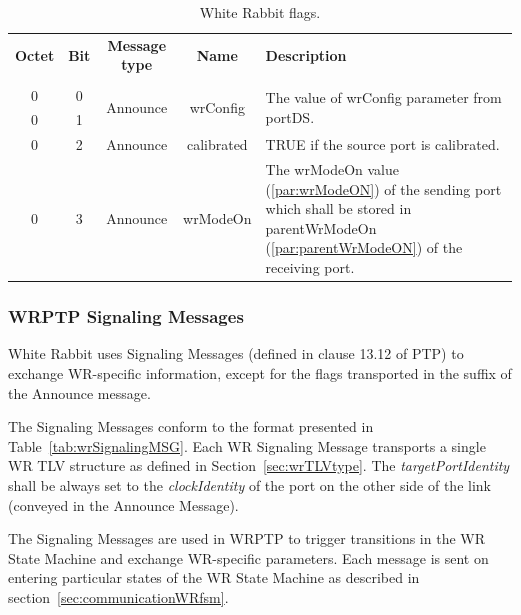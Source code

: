 \documentclass[a4paper, 12pt]{article}
\begin{document}
\begin{table}[ht!]
\caption{White Rabbit flags.}
\centering
\begin{tabular}{| c | c | c | c | p{5.3cm} |}          \hline

\textbf{Octet} &\textbf{Bit} & \textbf{Message type} & \textbf{Name}  & \textbf{Description}  \\ 
               &             &                       &                &              \\ \hline
0              &0   	& \multirow{2}{*}{Announce} 	& \multirow{2}{*}{wrConfig}  &
\multirow{2}{5.3cm}{The value of wrConfig parameter from portDS.} \\ \cline{1-2}
0              &1            &				& 		&\\ \hline
0              &2            & Announce              & calibrated     & TRUE if the source port 
									is calibrated.\\
									\hline
0              &3            & Announce              & wrModeOn     & The wrModeOn value 
								      (\ref{par:wrModeON}) of the 
								      sending port which shall be
								      stored in parentWrModeOn
								      (\ref{par:parentWrModeON})
								      of the receiving port.
								      \\ \hline
\end{tabular}
\label{tab:wrFlags}
\end{table}

\newpage


\subsubsection{WRPTP Signaling Messages}
\label{wrSignalingMSG}

White Rabbit uses Signaling Messages (defined in clause 13.12 of PTP) to exchange WR-specific 
information, except for the flags transported in the suffix of the Announce message. 

The Signaling Messages conform to the format presented in Table~\ref{tab:wrSignalingMSG}. Each WR
Signaling Message transports a single WR TLV structure as defined in Section~\ref{sec:wrTLVtype}.
The \textit{targetPortIdentity} shall be always set to the \textit{clockIdentity} of the port 
on the other side of the link (conveyed in the Announce Message). 

The Signaling Messages are used in WRPTP to trigger transitions in the WR State Machine and exchange 
WR-specific parameters. Each message is sent on entering particular states of the WR State Machine as 
described in section~\ref{sec:communicationWRfsm}.
\end{document}
